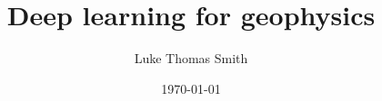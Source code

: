 \documentclass[12pt,a4paper]{report} %
\begin{document}
\author{Luke Thomas Smith}
\title{Deep learning for geophysics}
\date{\today}
\maketitle{}
\tableofcontents
\listoffigures
\listoftables

% 
% 
% 
\clearpage{}
% 
\end{document}
